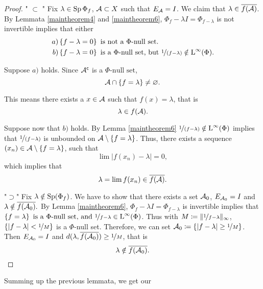 \begin{proof}
 " $\subset$ "
 Fix $\lambda \in \operatorname{Sp} \Phi_f$, $\mathcal{A} \subset X$ such that $E_\mathcal{A} = I$.
 We claim that $\lambda \in \overline{f(\mathcal{A})}$. By Lemmata \ref{maintheorem4}
 and \ref{maintheorem6}, $\Phi_f - \lambda I= \Phi_{f - \lambda}$ is 
 not invertible implies that either
\begin{align*}
  \left.  a\right)& \left\lbrace f- \lambda = 0 \right\rbrace \text{ is not a }\Phi
  \text{-null set}.\\
  \left.  b\right)& \left\lbrace f - \lambda =0 \right\rbrace \text{ is a }\Phi\text{-null set,
    but } \nicefrac{1}{(f- \lambda)} \notin {\text{L}^\infty }(\Phi).
\end{align*}

Suppose $a)$ holds. Since $\mathcal{A}^\mathsf{c}$ is a $\Phi\text{-null set}$,
\[
\mathcal{A} \cap \left\lbrace f= \lambda \right\rbrace \neq \varnothing .
\]

This means there exists a $x \in \mathcal{A}$ such that $f(x) = \lambda$, that is
\[
\lambda \in f(\mathcal{A}).
\]

Suppose now that $b)$ holds. By Lemma \ref{maintheorem6} $\nicefrac{1}{(f- \lambda)}
\notin {\text{L}^\infty }(\Phi)$ implies that $\nicefrac{1}{(f- \lambda)}$ is unbounded on
$\mathcal{A} \setminus \left\lbrace f= \lambda \right\rbrace$. Thus, there exists a sequence
$(x_n) \in \mathcal{A} \setminus \left\lbrace f= \lambda \right\rbrace$, such that
\[
 \lim | f(x_n) - \lambda| =0,
\]
which implies that
\[
\lambda = \lim f(x_n) \in \overline{f(\mathcal{A})}.
\]

"$\supset$"
Fix $\lambda \notin \operatorname{Sp} (\Phi_f)$. We have to show that there exists a set
$\mathcal{A}_0$, $E_{\mathcal{A}_0} = I$ and $\lambda \notin \overline{f(\mathcal{A}_0)}.$
By Lemma \ref{maintheorem6}, $\Phi_f - \lambda I= \Phi_{f- \lambda}$ is 
invertible implies that $ \left\lbrace f = \lambda \right\rbrace  \text{ is a }   \Phi
\text{-null set,} \text{ and } \nicefrac{1}{f - \lambda }  \in {\text{L}^\infty }(\Phi)$. Thus with 
$M \coloneqq \| \nicefrac{1}{f - \lambda} \|_\infty$,
$\left\lbrace | f- \lambda | < \nicefrac{1}{M} \right\rbrace$ is a $\Phi$-null set. Therefore,
we can set $\mathcal{A}_0 \coloneqq \left\lbrace | f- \lambda | \geq \nicefrac{1}{M} \right\rbrace $.
Then $E_{\mathcal{A}_0} = I$ and $d(\lambda, \overline{f(\mathcal{A}_0)}) \geq
\nicefrac{1}{M}$, that is 
\[
\lambda \notin \overline{f(\mathcal{A}_0)}.
\]

  
\end{proof}


Summing up the previous lemmata, we get our

